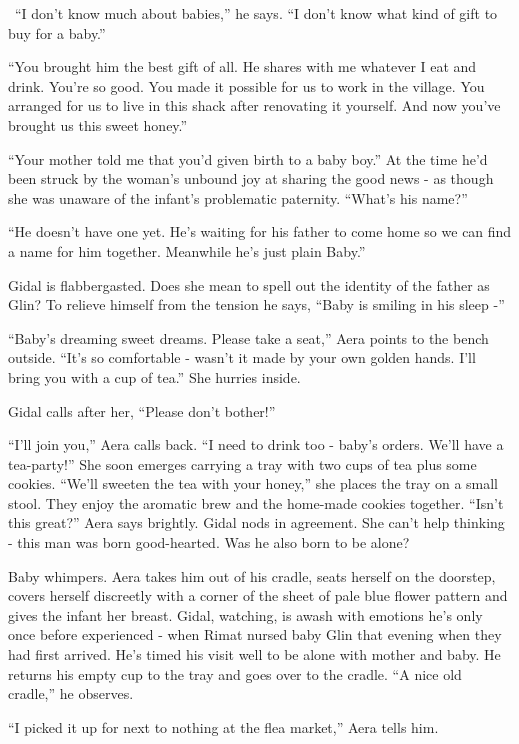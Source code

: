 \documentclass[twoside,11pt]{book}
\begin{document}
\ ``I don't know much about babies,'' he says. ``I don't know what kind of gift
to buy for a baby.''

``You brought him the best gift of all. He shares with me whatever I eat and drink. You're so good. You
made it possible for us to work in the village. You arranged for us to live
in this shack after renovating it yourself. And now you've brought us this sweet honey.''

``Your mother told me that you'd given birth to a baby
boy.'' At the time he'd been struck by the woman's unbound joy at sharing the good news - as though she
was unaware of the infant's problematic paternity. ``What's his name?''

``He doesn't have one yet. He's waiting for his father to come home so we can find a name for him together.
Meanwhile he's just plain Baby.''

Gidal is flabbergasted. Does she mean to spell out the identity of the father as Glin? To relieve himself from the
tension he says, ``Baby is smiling in his sleep -''

``Baby's dreaming sweet dreams. Please take a seat,'' Aera points to the bench
outside. ``It's so comfortable - wasn't it made by your own
golden hands. I'll bring you with a cup of tea.'' She hurries inside.

Gidal calls after her, ``Please don't bother!''


\bigskip

``I'll join you,'' Aera calls back. ``I need to drink too - baby's orders. We'll
have a tea-party!'' She soon emerges carrying a tray with two cups of tea plus some cookies.
``We'll sweeten the tea with your honey,'' she
places the tray on a small stool. They enjoy the aromatic brew and the home-made cookies together.
``Isn't this great?'' Aera says brightly. Gidal nods in agreement. She can't help thinking -
this man was born good-hearted. Was he also born to be alone?

Baby whimpers. Aera takes him out of his cradle, seats herself on the doorstep, covers herself
 discreetly with a corner of the
sheet of pale blue flower pattern and gives the infant her breast. Gidal, watching, is awash with
emotions he's only once before experienced - when Rimat nursed baby Glin that evening when they had
first arrived. He's timed his visit well to be alone with mother and baby. He returns his empty cup to the tray and
goes over to the cradle. ``A nice old cradle,'' he
observes.

``I picked it up for next to nothing at the flea market,'' Aera tells
him.
\end{document}
